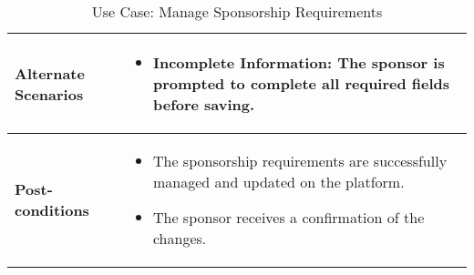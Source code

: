 \begin{table}[!ht]
\begin{tabularx}{\textwidth}{|l|X|}
        \hline
        \textbf{Alternate Scenarios} & 
        \begin{itemize}[label=--,itemsep=0pt]
            \item Incomplete Information: The sponsor is prompted to complete all required fields before saving.
        \end{itemize} \\
        \hline
        \textbf{Post-conditions} & 
        \begin{itemize}[label=--,itemsep=0pt]
            \item The sponsorship requirements are successfully managed and updated on the platform.
            \item The sponsor receives a confirmation of the changes.
        \end{itemize} \\
        \hline
    \end{tabularx}
    \caption{Use Case: Manage Sponsorship Requirements}
    \label{tab:use-case-register}
\end{table}


